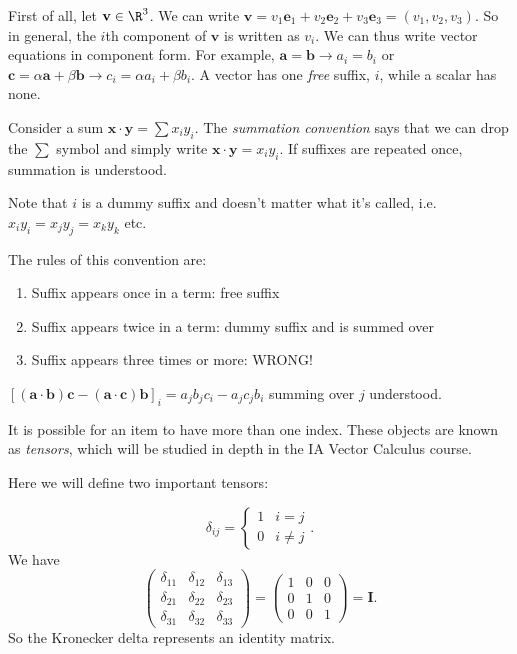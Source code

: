 \documentclass[a4paper]{article}
\begin{document}
First of all, let $\mathbf{v}\in \R^3$. We can write $\mathbf{v} = v_1\mathbf{e}_1 + v_2\mathbf{e}_2 + v_3\mathbf{e}_3 = (v_1, v_2, v_3)$. So in general, the $i$th component of $\mathbf{v}$ is written as $v_i$. We can thus write vector equations in component form. For example, $\mathbf{a} = \mathbf{b} \rightarrow a_i = b_i$ or $\mathbf{c}=\alpha\mathbf{a} + \beta\mathbf{b} \rightarrow c_i = \alpha a_i + \beta b_i$. A vector has one \emph{free} suffix, $i$, while a scalar has none.

\begin{notation}
  Consider a sum $\mathbf{x}\cdot \mathbf{y} = \sum x_i y_i$. The \emph{summation convention} says that we can drop the $\sum$ symbol and simply write $\mathbf{x}\cdot \mathbf{y} = x_i y_i$. If suffixes are repeated once, summation is understood.

  Note that $i$ is a dummy suffix and doesn't matter what it's called, i.e.\ $x_iy_i = x_jy_j = x_k y_k$ etc.

  The rules of this convention are:
  \begin{enumerate}
    \item Suffix appears once in a term: free suffix
    \item Suffix appears twice in a term: dummy suffix and is summed over
    \item Suffix appears three times or more: WRONG!
  \end{enumerate}
\end{notation}

\begin{eg}
  $[\mathbf{(a\cdot b)c - (a \cdot c)b}]_i = a_jb_jc_i - a_jc_jb_i$ summing over $j$ understood.
\end{eg}

It is possible for an item to have more than one index. These objects are known as \emph{tensors}, which will be studied in depth in the IA Vector Calculus course.

Here we will define two important tensors:
\begin{defi}\leavevmode
  \[
    \delta_{ij} =
    \begin{cases}
      1 & i = j\\
      0 & i\not=j
    \end{cases}.
  \]
  We have
  \[
    \begin{pmatrix}
      \delta_{11} & \delta_{12} & \delta_{13}\\
      \delta_{21} & \delta_{22} & \delta_{23}\\
      \delta_{31} & \delta_{32} & \delta_{33}
    \end{pmatrix} =
    \begin{pmatrix}
      1 & 0 & 0\\
      0 & 1 & 0\\
      0 & 0 & 1
    \end{pmatrix}
    = \mathbf{I}.
  \]
  So the Kronecker delta represents an identity matrix.
\end{defi}
\end{document}
